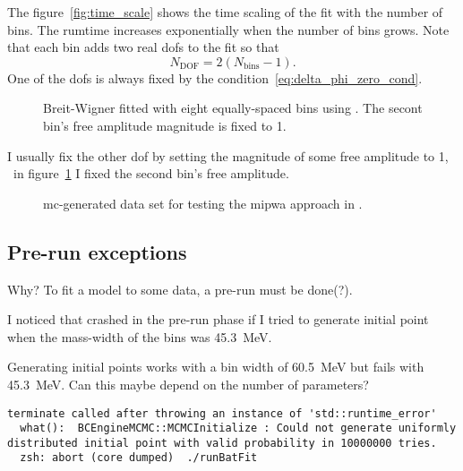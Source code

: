     The figure~\ref{fig:time_scale} shows the time scaling of the fit with the number of bins.
    The rumtime increases exponentially when the number of bins grows.
    Note that each bin adds two real \acp{dof} to the fit so that
    \begin{equation}
        N_\text{DOF} = 2(N_\text{bins} - 1).
    \end{equation}
    One of the \acp{dof} is always fixed by the condition~\eqref{eq:delta_phi_zero_cond}.
    \begin{figure}
        \centering
        
        \caption{Breit-Wigner fitted with eight equally-spaced bins using .
                 The secont bin's free amplitude magnitude is fixed to \num{1}.}
        \label{fig:mi_test_fit_amp_8bins}
    \end{figure}
    I usually fix the other \ac{dof} by setting the magnitude of some free amplitude to \num{1}, \eg{}~in figure~\ref{fig:mi_test_fit_amp_8bins} I fixed the second bin's free amplitude.


\begin{figure}
    \centering
    \caption{\ac{mc}-generated data set for testing the \ac{mipwa} approach in .}
    \label{fig:mi_test_data}
\end{figure}

    \subsection{Pre-run exceptions}

    {\color{red} Why?
    To fit a model to some data, a pre-run must be done(?).
    }

    I noticed that  crashed in the pre-run phase if I tried to generate initial point when the mass-width of the bins was \SI{45.3}{\mega\electronvolt}.

    Generating initial points works with a bin width of \SI{60.5}{\mega\electronvolt} but fails with \SI{45.3}{\mega\electronvolt}.
    Can this maybe depend on the number of parameters?

    \begin{lstlisting}
terminate called after throwing an instance of 'std::runtime_error'
  what():  BCEngineMCMC::MCMCInitialize : Could not generate uniformly distributed initial point with valid probability in 10000000 tries.
  zsh: abort (core dumped)  ./runBatFit
    \end{lstlisting}


